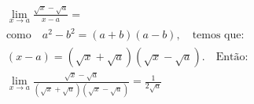 \begin{ex}
\begin{align}
&\lim_{x\rightarrow a} \frac{\sqrt{x}-\sqrt{a}}{x-a}=\nonumber\\
&\text{como}\quad{a^2-b^2=(a+b)(a-b)},\quad\text{temos que:}\nonumber\\
&(x-a) = (\sqrt{x}+\sqrt{a})(\sqrt{x}-\sqrt{a}).\quad\text{Então:}\nonumber\\
&\lim_{x\rightarrow a} \frac{\sqrt{x}-\sqrt{a}}{(\sqrt{x}+\sqrt{a})(\sqrt{x}-\sqrt{a})}=\frac{1}{2\sqrt{a}}\nonumber
\end{align}
\end{ex}